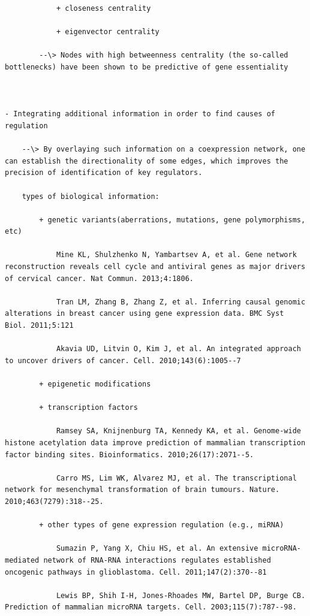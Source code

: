 \documentclass[
]{book}
\begin{document}
\begin{verbatim}
            + closeness centrality

            + eigenvector centrality

        --\> Nodes with high betweenness centrality (the so-called bottlenecks) have been shown to be predictive of gene essentiality



- Integrating additional information in order to find causes of regulation

    --\> By overlaying such information on a coexpression network, one can establish the directionality of some edges, which improves the precision of identification of key regulators.

    types of biological information:

        + genetic variants(aberrations, mutations, gene polymorphisms, etc)

            Mine KL, Shulzhenko N, Yambartsev A, et al. Gene network reconstruction reveals cell cycle and antiviral genes as major drivers of cervical cancer. Nat Commun. 2013;4:1806.

            Tran LM, Zhang B, Zhang Z, et al. Inferring causal genomic alterations in breast cancer using gene expression data. BMC Syst Biol. 2011;5:121

            Akavia UD, Litvin O, Kim J, et al. An integrated approach to uncover drivers of cancer. Cell. 2010;143(6):1005--7

        + epigenetic modifications

        + transcription factors

            Ramsey SA, Knijnenburg TA, Kennedy KA, et al. Genome-wide histone acetylation data improve prediction of mammalian transcription factor binding sites. Bioinformatics. 2010;26(17):2071--5.

            Carro MS, Lim WK, Alvarez MJ, et al. The transcriptional network for mesenchymal transformation of brain tumours. Nature. 2010;463(7279):318--25.

        + other types of gene expression regulation (e.g., miRNA)

            Sumazin P, Yang X, Chiu HS, et al. An extensive microRNA-mediated network of RNA-RNA interactions regulates established oncogenic pathways in glioblastoma. Cell. 2011;147(2):370--81

            Lewis BP, Shih I-H, Jones-Rhoades MW, Bartel DP, Burge CB. Prediction of mammalian microRNA targets. Cell. 2003;115(7):787--98.


\end{verbatim}
\end{document}
